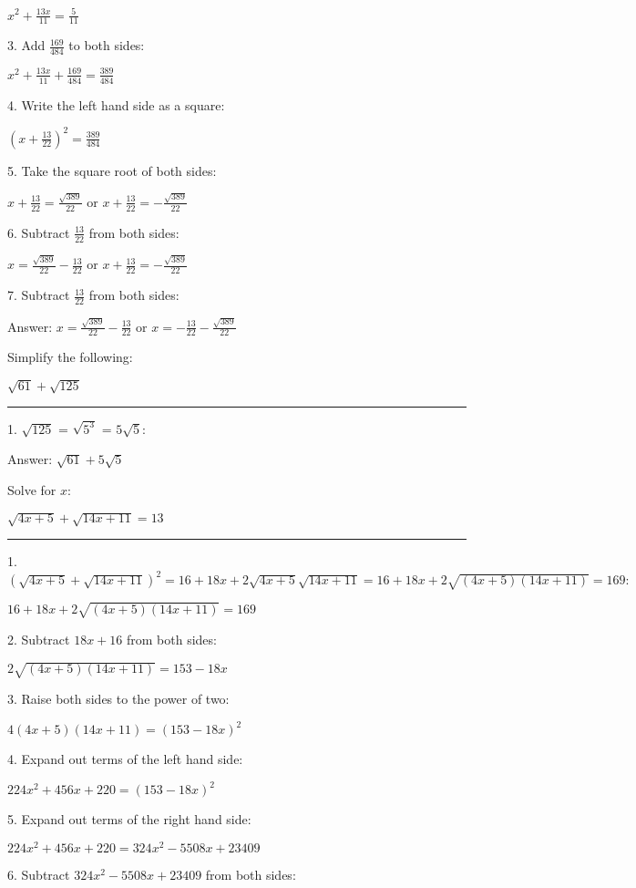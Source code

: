 \documentclass{article}
\begin{document}
$x^2+\frac{13 x}{11}=\frac{5}{11}$

3. Add $\frac{169}{484}$ to both sides:

$x^2+\frac{13 x}{11}+\frac{169}{484}=\frac{389}{484}$

4. Write the left hand side as a square:

$\left(x+\frac{13}{22}\right)^2=\frac{389}{484}$

5. Take the square root of both sides:

$x+\frac{13}{22}=\frac{\sqrt{389}}{22}\text{ or }x+\frac{13}{22}=-\frac{\sqrt{389}}{22}$

6. Subtract $\frac{13}{22}$ from both sides:

$x=\frac{\sqrt{389}}{22}-\frac{13}{22}\text{ or }x+\frac{13}{22}=-\frac{\sqrt{389}}{22}$

7. Subtract $\frac{13}{22}$ from both sides:

Answer: $x=\frac{\sqrt{389}}{22}-\frac{13}{22}\text{ or }x=-\frac{13}{22}-\frac{\sqrt{389}}{22}$

\pagebreak

Simplify the following:

$\sqrt{61}+\sqrt{125}$

\hrule

1. $\sqrt{125}\text{ = }\sqrt{5^3}\text{ = }5 \sqrt{5}$:

Answer: $\sqrt{61}+5 \sqrt{5}$

\pagebreak

Solve for $x:$

$\sqrt{4 x+5}+\sqrt{14 x+11}=13$

\hrule

1. $\left(\sqrt{4 x+5}+\sqrt{14 x+11}\right)^2=16+18 x+2 \sqrt{4 x+5} \sqrt{14 x+11}=16+18 x+2 \sqrt{(4 x+5) (14 x+11)}=169:$

$16+18 x+2 \sqrt{(4 x+5) (14 x+11)}=169$

2. Subtract $18 x+16$ from both sides:

$2 \sqrt{(4 x+5) (14 x+11)}=153-18 x$

3. Raise both sides to the power of two:

$4 (4 x+5) (14 x+11)=(153-18 x)^2$

4. Expand out terms of the left hand side:

$224 x^2+456 x+220=(153-18 x)^2$

5. Expand out terms of the right hand side:

$224 x^2+456 x+220=324 x^2-5508 x+23409$

6. Subtract $324 x^2-5508 x+23409$ from both sides:
\end{document}
